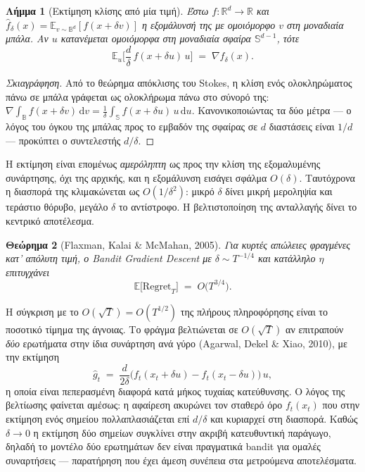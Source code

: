 \documentclass[12pt,a4paper,oneside]{report}
\newcommand{\en}[1]{\textenglish{#1}}
\renewcommand{\_}{\oldunderscore\allowbreak}
\theoremstyle{definition}
\theoremstyle{plain}
\newtheorem{theorem}{Θεώρημα}[chapter]
\newtheorem{lemma}[theorem]{Λήμμα}
\theoremstyle{remark}
\begin{document}
\begin{lemma}[Εκτίμηση κλίσης από μία τιμή]
\label{lem:one-point}
Έστω $f:\mathbb{R}^d \to \mathbb{R}$ και $\hat{f}_\delta(x) = \mathbb{E}_{v\sim \mathbb{B}^d}
[f(x+\delta v)]$ η εξομάλυνσή της με ομοιόμορφο $v$ στη μοναδιαία \emph{μπάλα}. Αν $u$
κατανέμεται ομοιόμορφα στη μοναδιαία \emph{σφαίρα} $\mathbb{S}^{d-1}$, τότε
\[
\mathbb{E}_u\Big[ \frac{d}{\delta}\, f(x + \delta u)\, u \Big] \;=\; \nabla \hat{f}_\delta(x).
\]
\end{lemma}

\begin{proof}[Σκιαγράφηση]
Από το θεώρημα απόκλισης του Stokes, η κλίση ενός ολοκληρώματος πάνω σε μπάλα γράφεται ως
ολοκλήρωμα πάνω στο σύνορό της: $\nabla \int_{\mathbb{B}} f(x+\delta v)\,\mathrm{d}v =
\frac{1}{\delta}\int_{\mathbb{S}} f(x+\delta u)\, u\, \mathrm{d}u$. Κανονικοποιώντας τα δύο
μέτρα --- ο λόγος του όγκου της μπάλας προς το εμβαδόν της σφαίρας σε $d$ διαστάσεις είναι
$1/d$ --- προκύπτει ο συντελεστής $d/\delta$.
\end{proof}

Η εκτίμηση είναι επομένως \emph{αμερόληπτη} ως προς την κλίση της εξομαλυμένης συνάρτησης,
όχι της αρχικής, και η εξομάλυνση εισάγει σφάλμα $O(\delta)$. Ταυτόχρονα η διασπορά της
κλιμακώνεται ως $O(1/\delta^2)$: μικρό $\delta$ δίνει μικρή μεροληψία και τεράστιο θόρυβο,
μεγάλο $\delta$ το αντίστροφο. Η βελτιστοποίηση της ανταλλαγής δίνει το κεντρικό αποτέλεσμα.

\begin{theorem}[Flaxman, Kalai \& McMahan, 2005]
\label{thm:bgd}
Για κυρτές απώλειες φραγμένες κατ' απόλυτη τιμή, ο \en{Bandit Gradient Descent} με
$\delta \sim T^{-1/4}$ και κατάλληλο $\eta$ επιτυγχάνει
\[
\mathbb{E}\big[\mathrm{Regret}_T\big] \;=\; O\big(T^{3/4}\big).
\]
\end{theorem}

Η σύγκριση με το $O(\sqrt{T}) = O(T^{1/2})$ της πλήρους πληροφόρησης είναι το ποσοτικό τίμημα
της άγνοιας. Το φράγμα βελτιώνεται σε $O(\sqrt{T})$ αν επιτραπούν \emph{δύο} ερωτήματα στην
ίδια συνάρτηση ανά γύρο (Agarwal, Dekel \& Xiao, 2010), με την εκτίμηση
\[
\hat{g}_t \;=\; \frac{d}{2\delta}\big( f_t(x_t + \delta u) - f_t(x_t - \delta u) \big)\, u,
\]
η οποία είναι πεπερασμένη διαφορά κατά μήκος τυχαίας κατεύθυνσης. Ο λόγος της βελτίωσης
φαίνεται αμέσως: η αφαίρεση ακυρώνει τον σταθερό όρο $f_t(x_t)$ που στην εκτίμηση ενός
σημείου πολλαπλασιάζεται επί $d/\delta$ και κυριαρχεί στη διασπορά. Καθώς $\delta \to 0$ η
εκτίμηση δύο σημείων συγκλίνει στην ακριβή κατευθυντική παράγωγο, δηλαδή το μοντέλο δύο
ερωτημάτων δεν είναι πραγματικά bandit για ομαλές συναρτήσεις --- παρατήρηση που έχει άμεση
συνέπεια στα μετρούμενα αποτελέσματα.
\end{document}

